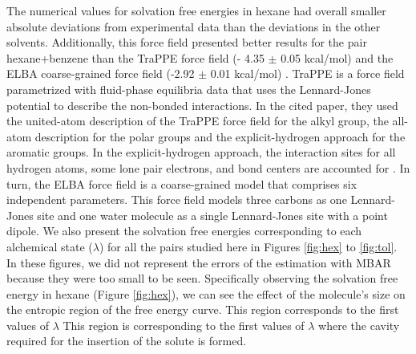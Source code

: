 The numerical values for solvation free energies in hexane had overall smaller absolute deviations from experimental data than the deviations in the other solvents. Additionally, this force field presented better results for the pair hexane+benzene than the TraPPE force field (- 4.35  $\pm$ 0.05 kcal/mol) \cite{garrido2011} and the ELBA coarse-grained force field  (-2.92 $\pm$ 0.01 kcal/mol) \cite{doi:10.1021/acs.jctc.5b00963}. TraPPE is a force field parametrized with fluid-phase equilibria data that uses the Lennard-Jones potential to describe the non-bonded interactions. In the cited paper, they used the united-atom description of the TraPPE force field for the alkyl group, the all-atom description for the polar groups and the explicit-hydrogen approach for the aromatic groups. In the explicit-hydrogen approach, the interaction sites for all hydrogen atoms, some lone pair electrons, and bond centers are accounted for \cite{doi:10.1021/jp073586l}. In turn, the ELBA force field is a coarse-grained model that comprises six independent parameters. This force field models three carbons as one Lennard-Jones site and one water molecule as a single Lennard-Jones site with a point dipole. We also present the solvation free energies corresponding to each alchemical state ($\lambda$) for all the pairs studied here in Figures \ref{fig:hex} to \ref{fig:tol}. In these figures, we did not represent the errors of the estimation with MBAR because they were too small to be seen. Specifically observing the solvation free energy in hexane (Figure \ref{fig:hex}), we can see the effect of the molecule's size on the entropic region of the free energy curve. This region corresponds to the first values of $\lambda$ This region is corresponding to the first values of $\lambda$ where the cavity required for the insertion of the solute is formed.

